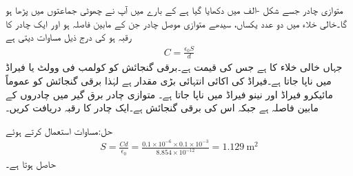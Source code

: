 
متوازی چادر  جسے شکل -الف میں دکھایا گیا ہے کے بارے میں آپ نے چھوٹی جماعتوں میں پڑھا ہو گا۔خالی خلاء میں دو عدد یکساں، سیدھے متوازی موصل چادر جن کے مابین فاصلہ  ہو اور  ایک چادر کا رقبہ  ہو کی   درج ذیل مساوات دیتی ہے
\begin{align}\label{مساوات_امالہ_تعریف_مساوات}
C=\frac{\epsilon_0 S}{d}
\end{align}
جہاں  خالی خلاء کا  ہے جس کی قیمت  ہے۔برقی گنجائش کو کولمب فی وولٹ  یا فیراڈ  میں ناپا جاتا ہے۔فیراڈ کی اکائی انتہائی بڑی مقدار ہے  لہٰذا برقی گنجائش کو عموماً مائیکرو فیراڈ  اور نینو فیراڈ  میں ناپا جاتا ہے۔
متوازی چادر برق گیر میں چادروں کے مابین فاصلہ  ہے جبکہ اس کی برقی گنجائش  ہے۔ایک چادر کا رقبہ دریافت کریں۔

حل:مساوات  استعمال کرتے ہوئے
\begin{align*}
S=\frac{C d}{\epsilon_0}=\frac{0.1\times 10^{-6} \times 0.1\times 10^{-3}}{8.854\times 10^{-12}}=\SI{1.129}{\meter\squared}
\end{align*}
حاصل ہوتا ہے۔

